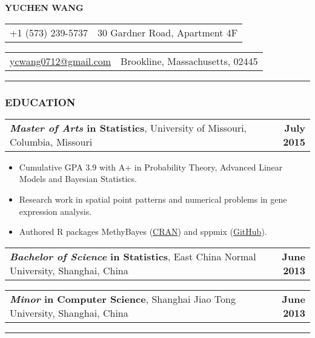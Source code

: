 \documentclass[11pt]{article}
\makeatletter
\newcommand{\headerrow}[2]
{\begin{tabular*}{\linewidth}{l@{\extracolsep{\fill}}r}
	#1 & #2 \\
\end{tabular*}
}
\makeatother
\begin{document}
\begin{center}
	\huge\textbf{YUCHEN WANG}
\end{center}

\noindent\headerrow{+1 (573) 239-5737}{30 Gardner Road, Apartment 4F}
\headerrow{\href{mailto:ycwang0712@gmail.com}{ycwang0712@gmail.com}}{Brookline, Massachusetts, 02445}

\vspace{-.8em}
\hrule

\subsubsection*{\centering EDUCATION}
\vspace{-.3em}

\headerrow
	{\textbf{\emph{Master of Arts} in Statistics}, University of Missouri, Columbia, Missouri}
	{\textbf{July 2015}}
	\begin{itemize}
		\item Cumulative GPA 3.9 with A+ in Probability Theory, Advanced Linear Models and Bayesian Statistics.
		\item Research work in spatial point patterns and numerical problems in gene expression analysis.
		\item Authored R packages MethyBayes
		(\href{http://cran.wustl.edu/web/packages/MethyBayes/index.html}{CRAN}) and
		sppmix (\href{https://github.com/wangyuchen/sppmix}{GitHub}).
	\end{itemize}

\noindent\headerrow
	{\textbf{\emph{Bachelor of Science} in Statistics}, East China Normal University, Shanghai, China}
	{\textbf{June 2013}}
\noindent\headerrow
	{\textbf{\emph{Minor} in Computer Science}, Shanghai Jiao Tong University, Shanghai, China}
	{\textbf{June 2013}}


\vspace{-.8em}
\hrule
\end{document}

